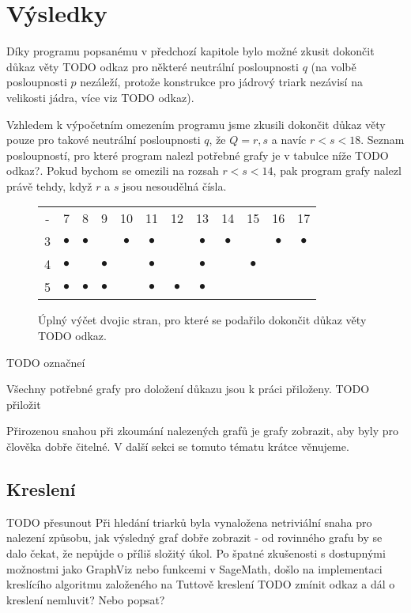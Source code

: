 
\chapter{Výsledky}

Díky programu popsanému v předchozí kapitole bylo možné zkusit dokončit důkaz věty TODO odkaz pro některé neutrální posloupnosti $q$ (na volbě posloupnosti $p$ nezáleží, protože konstrukce pro jádrový triark nezávisí na velikosti jádra, více viz TODO odkaz). 

Vzhledem k výpočetním omezením programu jsme zkusili dokončit důkaz věty pouze pro takové neutrální posloupnosti $q$, že $Q = {r, s}$ a navíc $r<s<18$. Seznam posloupností, pro které program nalezl potřebné grafy je v tabulce níže TODO odkaz?. Pokud bychom se omezili na rozsah $r<s<14$, pak program grafy nalezl právě tehdy, když $r$ a $s$ jsou nesoudělná čísla.

\begin{figure}[h]\centering
\begin{tabular}{ c c c c c c c c c c c c }
  - & 7 & 8 & 9 & 10 & 11 & 12 & 13 & 14 & 15 & 16 & 17 \\
  3 & $\bullet$ & $\bullet$ &  & $\bullet$ & $\bullet$ &  & $\bullet$ & $\bullet$ &  & $\bullet$ & $\bullet$ \\
  4 & $\bullet$ &  & $\bullet$ &  & $\bullet$ &  & $\bullet$ &  & $\bullet$ \\
  5 & $\bullet$ & $\bullet$ & $\bullet$ &  & $\bullet$ & $\bullet$ & $\bullet$  
\end{tabular}
\caption{Úplný výčet dvojic stran, pro které se podařilo dokončit důkaz věty TODO odkaz.}
\label{obr03:Nvyber}
\end{figure}
TODO označneí

Všechny potřebné grafy pro doložení důkazu jsou k práci přiloženy. TODO přiložit

Přirozenou snahou při zkoumání nalezených grafů je grafy zobrazit, aby byly pro člověka dobře čitelné. V další sekci se tomuto tématu krátce věnujeme. 

\section{Kreslení}

TODO přesunout
Při hledání triarků byla vynaložena netriviální snaha pro nalezení způsobu, jak výsledný graf dobře zobrazit - od rovinného grafu by se dalo čekat, že nepůjde o příliš složitý úkol. Po špatné zkušenosti s dostupnými možnostmi jako GraphViz nebo funkcemi v SageMath, došlo na implementaci kreslícího algoritmu založeného na Tuttově kreslení TODO zmínit odkaz a dál o kreslení nemluvit? Nebo popsat? 
